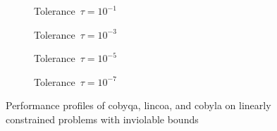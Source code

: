 \begin{figure}[ht]
    \centering
    \begin{subfigure}[b]{0.49\textwidth}
        \centering
        \caption{Tolerance~$\tau = 10^{-1}$}
    \end{subfigure}
    \hfill
    \begin{subfigure}[b]{0.49\textwidth}
        \centering
        \caption{Tolerance~$\tau = 10^{-3}$}
    \end{subfigure}
    \begin{subfigure}[b]{0.49\textwidth}
        \centering
        \caption{Tolerance~$\tau = 10^{-5}$}
    \end{subfigure}
    \hfill
    \begin{subfigure}[b]{0.49\textwidth}
        \centering
        \caption{Tolerance~$\tau = 10^{-7}$}
    \end{subfigure}
    \caption[Performance profiles on linearly constrained problems with bounds]{Performance profiles of \gls{cobyqa}, \gls{lincoa}, and \gls{cobyla} on linearly constrained problems with inviolable bounds}
    \label{fig:perf-linearly-constrained-problems-bounds}
\end{figure}

